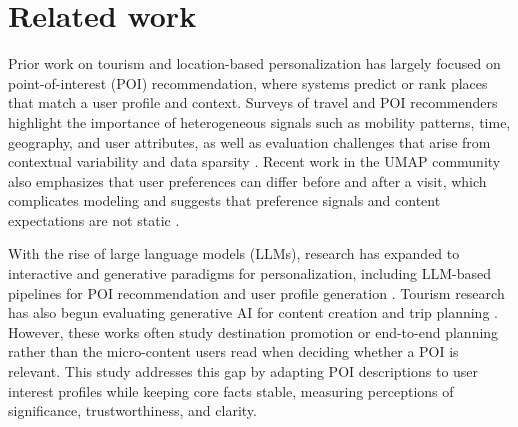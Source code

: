 \section{Related work}

Prior work on tourism and location-based personalization has largely focused on point-of-interest (POI) recommendation, where systems predict or rank places that match a user profile and context. Surveys of travel and POI recommenders highlight the importance of heterogeneous signals such as mobility patterns, time, geography, and user attributes, as well as evaluation challenges that arise from contextual variability and data sparsity \cite{renjith_extensive_2020,wang_survey_2025}. Recent work in the UMAP community also emphasizes that user preferences can differ before and after a visit, which complicates modeling and suggests that preference signals and content expectations are not static \cite{hofschen_expected_2023}.

With the rise of large language models (LLMs), research has expanded to interactive and generative paradigms for personalization, including LLM-based pipelines for POI recommendation and user profile generation \cite{wang_embracing_2024,wang_point--interest_2025,Li2024SIGIR_LLMNextPOI,noauthor_genup_nodate}. Tourism research has also begun evaluating generative AI for content creation and trip planning \cite{li_generative_2025,zhang_co-creating_2024,hsu_fine-tuned_2024}. However, these works often study destination promotion or end-to-end planning rather than the micro-content users read when deciding whether a POI is relevant. This study addresses this gap by adapting POI descriptions to user interest profiles while keeping core facts stable, measuring perceptions of significance, trustworthiness, and clarity.

